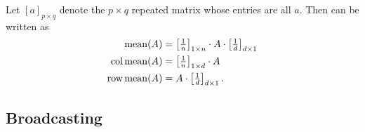 \def\repmat#1#2{\textstyle\left[#1\right]_{#2}}
Let \([a]_{p \times q}\) denote the \(p \times q\) repeated matrix whose entries are all \(a\).
Then  can be written as
\begin{align}
    \mean(A) &= \repmat{\frac{1}{n}}{1 \times n} \cdot A \cdot \repmat{\frac{1}{d}}{d \times 1}\\
    \colmean(A) &= \repmat{\frac{1}{n}}{1 \times d} \cdot A \\
    \rowmean(A) &= A \cdot \repmat{\frac{1}{d}}{d \times 1}.
\end{align}


\subsection{Broadcasting}
\label{subsec:broadcasting}

